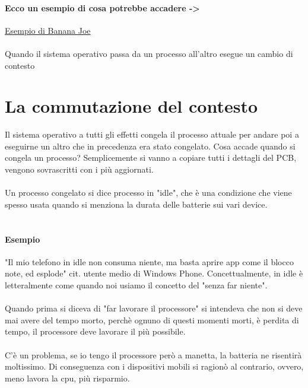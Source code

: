 \documentclass[12pt, a4paper, openany, twoside]{book}
\begin{document}
\paragraph{Ecco un esempio di cosa potrebbe accadere -> }
\href{https://www.youtube.com/watch?v=-c08d9SZLqg}{Esempio di Banana Joe}
\\ \\
Quando il sistema operativo passa da un processo all'altro esegue un cambio
di contesto 
\section{La commutazione del contesto}
Il sistema operativo a tutti gli effetti congela il processo attuale per andare
poi a eseguirne un altro che in precedenza era stato congelato. Cosa accade
quando si congela un processo? Semplicemente si vanno a copiare tutti i dettagli
del PCB, vengono sovrascritti con i più aggiornati. \\ \\
Un processo congelato si dice processo in "idle", che è una condizione che viene
spesso usata quando si menziona la durata delle batterie sui vari device. \\ \\
\paragraph{Esempio}
"Il mio telefono in idle non consuma niente, ma basta aprire app come il 
blocco note, ed esplode" cit. utente medio di Windows Phone. Concettualmente,
in idle è letteralmente come quando noi usiamo il concetto del "senza far 
niente".\\ \\
Quando prima si diceva di "far lavorare il processore" si intendeva che non 
si deve mai avere del tempo morto, perchè ognuno di questi momenti morti, è 
perdita di tempo, il processore deve lavorare il più possibile. \\ \\
C'è un problema, se io tengo il processore però a manetta, la batteria ne risentirà
moltissimo. Di conseguenza con i dispositivi mobili si ragionò al contrario, 
ovvero, meno lavora la cpu, più risparmio. \\ \\
\end{document}
